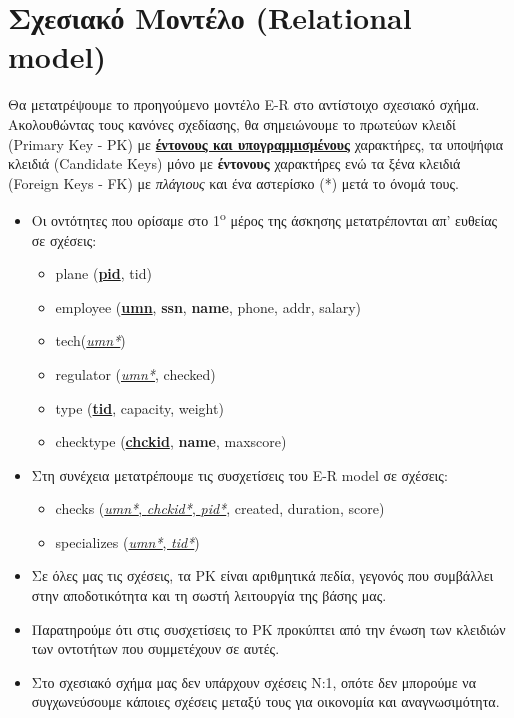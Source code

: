 \documentclass[a4paper]{article}
\begin{document}
\section{Σχεσιακό Μοντέλο  (Relational model)}
Θα μετατρέψουμε το προηγούμενο μοντέλο E-R στο αντίστοιχο σχεσιακό σχήμα.
Ακολουθώντας τους κανόνες σχεδίασης, θα σημειώνουμε το πρωτεύων κλειδί
(Primary Key - PK) με  \underline{\textbf{έντονους και υπογραμμισμένους}} χαρακτήρες,
τα υποψήφια κλειδιά (Candidate Keys) μόνο με \textbf{έντονους}
χαρακτήρες ενώ τα ξένα κλειδιά (Foreign Keys - FK) με \textit{πλάγιους} και ένα αστερίσκο (*) μετά
το όνομά τους.\\


\begin{itemize}
\item Οι οντότητες που ορίσαμε στο 1\textsuperscript{o} μέρος της άσκησης
μετατρέπονται απ' ευθείας σε σχέσεις:
\begin{itemize}
\item plane (\underline{\textbf{pid}}, tid)
\item employee (\underline{\textbf{umn}}, \textbf{ssn}, \textbf{name}, phone, addr, salary)
\tab \item tech(\underline{\textit{umn*}})
\tab \item regulator (\underline{\textit{umn*}}, checked)
\item type (\underline{\textbf{tid}}, capacity, weight)
\item checktype (\underline{\textbf{chckid}}, \textbf{name}, maxscore)\\
\end{itemize}

\item Στη συνέχεια μετατρέπουμε τις συσχετίσεις του E-R model σε σχέσεις:
\begin{itemize}
\item checks (\underline{\textit{umn*}, \textit{chckid*}, \textit{pid*}}, created,
duration, score)
\item specializes (\underline{\textit{umn*}, \textit{tid*}})\\

\end{itemize}
\end{itemize}

\begin{itemize}
\renewcommand{\labelitemi}{$\diamondsuit$}
\item Σε όλες μας τις σχέσεις, τα PK είναι αριθμητικά πεδία, γεγονός που
συμβάλλει στην αποδοτικότητα και τη σωστή λειτουργία της βάσης μας.
\item Παρατηρούμε ότι στις συσχετίσεις το PK προκύπτει από την ένωση των
κλειδιών των οντοτήτων που συμμετέχουν σε αυτές.
\item Στο σχεσιακό σχήμα μας δεν υπάρχουν σχέσεις Ν:1, οπότε δεν μπορούμε να
συγχωνεύσουμε κάποιες σχέσεις μεταξύ τους για οικονομία και αναγνωσιμότητα.\\
\renewcommand{\labelitemi}{$\bullet$}
\end{itemize}
\end{document}
